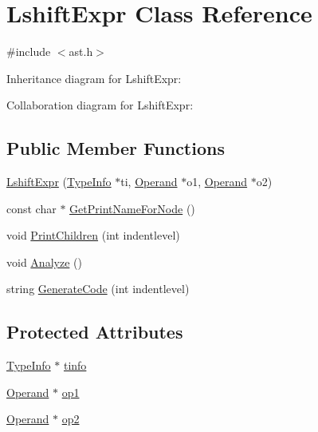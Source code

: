 \hypertarget{class_lshift_expr}{}\section{Lshift\+Expr Class Reference}
\label{class_lshift_expr}


{\ttfamily \#include $<$ast.\+h$>$}



Inheritance diagram for Lshift\+Expr\+:


Collaboration diagram for Lshift\+Expr\+:
\subsection*{Public Member Functions}
\begin{DoxyCompactItemize}
\item 
\hyperlink{class_lshift_expr_ab2ed23d37c701ff989ba067eed3ba82c}{Lshift\+Expr} (\hyperlink{class_type_info}{Type\+Info} $\ast$ti, \hyperlink{class_operand}{Operand} $\ast$o1, \hyperlink{class_operand}{Operand} $\ast$o2)
\item 
const char $\ast$ \hyperlink{class_lshift_expr_ad4a55396ab3c94748ef2c165cf6abce4}{Get\+Print\+Name\+For\+Node} ()
\item 
void \hyperlink{class_lshift_expr_a01b9cf72d82eeaa4f57ebd87bf20f54b}{Print\+Children} (int indentlevel)
\item 
void \hyperlink{class_lshift_expr_a7d479d7c72009f168afdb15b08e73163}{Analyze} ()
\item 
string \hyperlink{class_lshift_expr_af6e1f11ac0f62d48377eb064ca092f57}{Generate\+Code} (int indentlevel)
\end{DoxyCompactItemize}
\subsection*{Protected Attributes}
\begin{DoxyCompactItemize}
\item 
\hyperlink{class_type_info}{Type\+Info} $\ast$ \hyperlink{class_lshift_expr_ae5943ee9b52c7124a25a2f43238561af}{tinfo}
\item 
\hyperlink{class_operand}{Operand} $\ast$ \hyperlink{class_lshift_expr_a09d1f3231f0a2c79349d5e0c1799684b}{op1}
\item 
\hyperlink{class_operand}{Operand} $\ast$ \hyperlink{class_lshift_expr_a1822bf673e7eead888ae65c47bd7cd18}{op2}
\end{DoxyCompactItemize}



